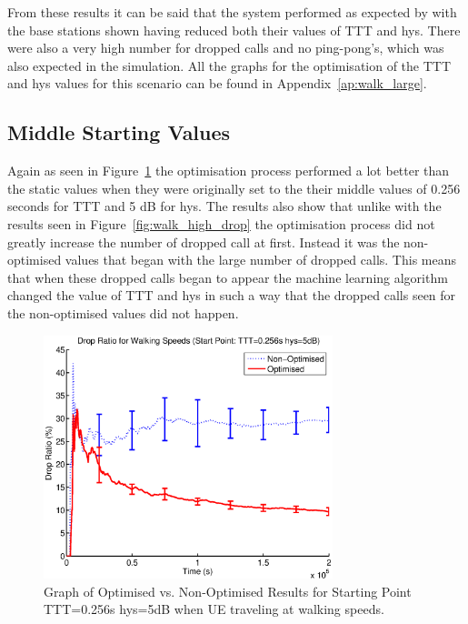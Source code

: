 From these results it can be said that the system performed as expected by with the base stations shown having reduced both their values of TTT and hys. There were also a very high number for dropped calls and no ping-pong's, which was also expected in the simulation. All the graphs for the optimisation of the TTT and hys values for this scenario can be found in Appendix~\ref{ap:walk_large}.
\subsection{Middle Starting Values}
Again as seen in Figure~\ref{fig:walk_mid_drop} the optimisation process performed a lot better than the static values when they were originally set to the their middle values of 0.256 seconds for TTT and 5 dB for hys. The results also show that unlike with the results seen in Figure~\ref{fig:walk_high_drop} the optimisation process did not greatly increase the number of dropped call at first. Instead it was the non-optimised values that began with the large number of dropped calls. This means that when these dropped calls began to appear the machine learning algorithm changed the value of TTT and hys in such a way that the dropped calls seen for the non-optimised values did not happen.
\begin{figure}[H]
  \begin{center}
    	  \includegraphics[width=0.75\textwidth]{figures/walking_figures/walkmid.eps}
    \end{center}
    \caption{Graph of Optimised vs. Non-Optimised Results for Starting Point TTT=0.256s hys=5dB when UE traveling at walking speeds.}
    \label{fig:walk_mid_drop}
\end{figure}
